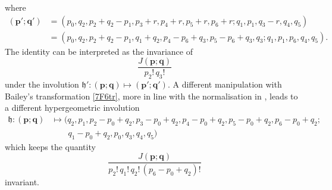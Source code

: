 \documentclass[12pt,reqno]{amsart}
\theoremstyle{remark}
\newcommand\bp{\boldsymbol p}
\newcommand\bq{\boldsymbol q}
\newcommand\frh{\mathfrak h}
\begin{document}
where
\begin{align*}
(\bp';\bq')
&=(p_0,q_2,p_2+q_2-p_1,p_3+r,p_4+r,p_5+r,p_6+r; q_1,p_1,q_3-r,q_4,q_5)
\\
&=(p_0,q_2,p_2+q_2-p_1,q_1+q_2,p_4-p_6+q_3,p_5-p_6+q_3,q_3; q_1,p_1,p_6,q_4,q_5).
\end{align*}
The identity can be interpreted as the invariance of
\[
\frac{J(\bp;\bq)}{p_2!\,q_3!}
\]
under the involution $\frh'\colon(\bp;\bq)\mapsto(\bp';\bq')$.
A different manipulation with Bailey's transformation \eqref{7F6tr}, more in line with the normalisation in \cite[Sect.~4]{Zu04}, leads to a different hypergeometric involution
\begin{align*}
\frh\colon(\bp;\bq)
&\mapsto(q_2,p_1,p_2-p_0+q_2,p_3-p_0+q_2,p_4-p_0+q_2,p_5-p_0+q_2,p_6-p_0+q_2;
\\ &\qquad
q_1-p_0+q_2,p_0,q_3,q_4,q_5)
\end{align*}
which keeps the quantity
\[
\frac{J(\bp;\bq)}{p_2!\,q_1!\,q_2!\,(p_6-p_0+q_2)!}
\]
invariant.
\end{document}
